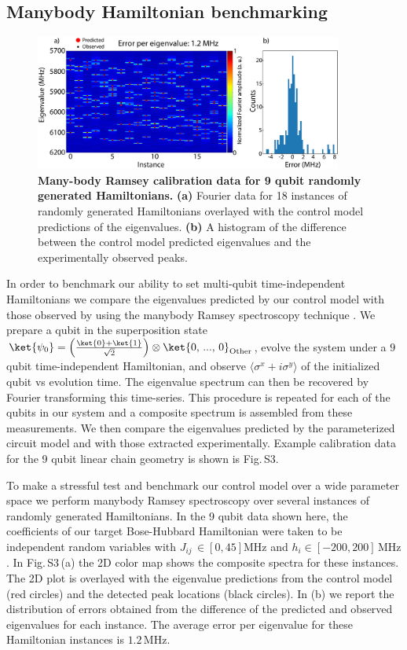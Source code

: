 \subsection{Manybody Hamiltonian benchmarking}
\begin{figure}
    \centering
    \includegraphics[width=0.9\textwidth, keepaspectratio]{./PDF/random_hamiltonian_calibration_data_190508_549p.pdf}
    \caption{\textbf{Many-body Ramsey calibration data for 9 qubit randomly generated Hamiltonians.}
    \textbf{(a)} Fourier data for 18 instances of randomly generated Hamiltonians overlayed with the control model predictions of the eigenvalues.
    \textbf{(b)} A histogram of the difference between the control model predicted eigenvalues and the experimentally observed peaks.
    }\end{figure}
    In order to benchmark our ability to set multi-qubit time-independent Hamiltonians we compare the eigenvalues predicted by our control model with those observed by using the manybody Ramsey spectroscopy technique \autocite{Roushan2018}.
    We prepare a qubit in the superposition state
    $\ket{\psi_0} = \left( \frac{\ket{0} + \ket{1} }{\sqrt{2}} \right) \otimes \ket{ \text{0, ..., 0} }_{\text{Other}}$,
    evolve the system under a $9$ qubit time-independent Hamiltonian, and observe $\langle \sigma^x + i \sigma^y \rangle$ of the initialized qubit vs evolution time.
    The eigenvalue spectrum can then be recovered by Fourier transforming this time-series.
    This procedure is repeated for each of the qubits in our system and a composite spectrum is assembled from these measurements.
We then compare the eigenvalues predicted by the parameterized circuit model and with those extracted experimentally.  Example calibration data for the 9 qubit linear chain geometry is shown is Fig.\,S3.

    To make a stressful test and benchmark our control model over a wide parameter space we perform manybody Ramsey spectroscopy over several instances of randomly generated Hamiltonians.
    In the 9 qubit data shown here, the coefficients of our target Bose-Hubbard Hamiltonian were taken to be independent random variables with $J_{ij}\, \in[0, 45] \text{MHz}$ and $h_{i} \in[-200, 200] \, \text{MHz}$.
    In Fig.\,S3\,(a) the 2D color map shows the composite spectra for these instances.  The 2D plot is overlayed with the eigenvalue predictions from the control model (red circles) and the detected peak locations (black circles).
    In (b) we report the distribution of errors obtained from the difference of the predicted and observed eigenvalues for each instance.
    The average error per eigenvalue for these Hamiltonian instances is $1.2 \, \text{MHz}$.

